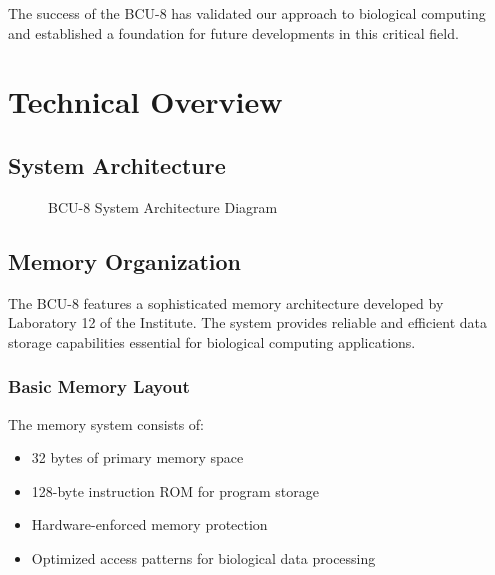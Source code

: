 \documentclass[12pt]{article}
\begin{document}
The success of the BCU-8 has validated our approach to biological computing and established a foundation for future developments in this critical field.

\section{Technical Overview}
\subsection{System Architecture}
\begin{figure}[h]
\centering
{}
\caption{BCU-8 System Architecture Diagram}
\end{figure}

\subsection{Memory Organization}
The BCU-8 features a sophisticated memory architecture developed by Laboratory 12 of the Institute. The system provides reliable and efficient data storage capabilities essential for biological computing applications.

\subsubsection{Basic Memory Layout}
The memory system consists of:
\begin{itemize}
    \item 32 bytes of primary memory space
    \item 128-byte instruction ROM for program storage
    \item Hardware-enforced memory protection
    \item Optimized access patterns for biological data processing
\end{itemize}
\end{document}
